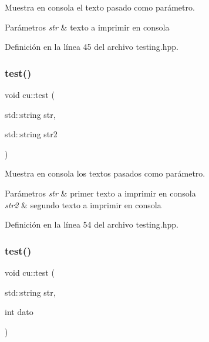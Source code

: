 Muestra en consola el texto pasado como parámetro. 


\begin{DoxyParams}{Parámetros}
{\em str} & texto a imprimir en consola \\
\hline
\end{DoxyParams}


Definición en la línea 45 del archivo testing.\+hpp.

\mbox{\label{namespacecu_a29c88a60e2e11b522402097bac91dd53}} 
\subsubsection{\texorpdfstring{test()}{test()}\hspace{0.1cm}{\footnotesize\ttfamily [2/6]}}
{\footnotesize\ttfamily void cu\+::test (\begin{DoxyParamCaption}\item[{std\+::string}]{str,  }\item[{std\+::string}]{str2 }\end{DoxyParamCaption})}



Muestra en consola los textos pasados como parámetro. 


\begin{DoxyParams}{Parámetros}
{\em str} & primer texto a imprimir en consola \\
\hline
{\em str2} & segundo texto a imprimir en consola \\
\hline
\end{DoxyParams}


Definición en la línea 54 del archivo testing.\+hpp.

\mbox{\label{namespacecu_a204c06884ca90cec812a74a79978ad1b}} 
\subsubsection{\texorpdfstring{test()}{test()}\hspace{0.1cm}{\footnotesize\ttfamily [3/6]}}
{\footnotesize\ttfamily void cu\+::test (\begin{DoxyParamCaption}\item[{std\+::string}]{str,  }\item[{int}]{dato }\end{DoxyParamCaption})}



